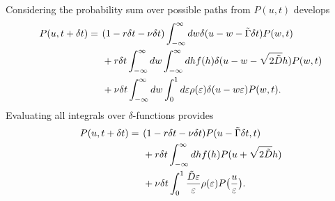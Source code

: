 Considering the probability \DIFdelbegin {}\DIFdelend \DIFaddbegin {}\DIFaddend sum over possible paths from $P(u,t)$ develops 
\DIFdelbegin %
\DIFdelend \DIFaddbegin \begin{align} 
\begin{split}
P(u,t+\delta t) =
	\hspace{4pt}&(1- r \delta t - \nu \delta t)\int_{-\infty}^\infty dw  \delta(u-w-\tilde{\Gamma} \delta t) P(w,t)\\ 
	&+  r \delta t \int_{-\infty}^\infty dw \int_{-\infty}^\infty dh f(h) \delta (u - w - \sqrt{2 \tilde{D}}h) P(w,t) \\ 
	&+ \nu \delta t \int_{-\infty}^\infty dw \int_0^1 d\varepsilon \rho(\varepsilon)  \delta(u-w\varepsilon) P(w,t).
\end{split}
\end{align}\DIFaddend 
Evaluating all integrals over $\delta$-functions provides 
\DIFdelbegin %
\DIFdelend \DIFaddbegin \begin{align}
\begin{split}
 P(u,t+\delta t) = \hspace{4pt}&(1-r \delta t - \nu \delta t)P(u-\tilde{\Gamma} \delta t, t) \\&+ r \delta t\int_{-\infty}^\infty dh f(h) P(u+\sqrt{2 \tilde{D}}h) \\&+ \nu \delta t \int_0^1 \frac{ \tilde{D}\varepsilon}{\varepsilon} \rho(\varepsilon) P\big(\frac{u}{\varepsilon}\big).
\end{split}
\end{align}\DIFaddend 
